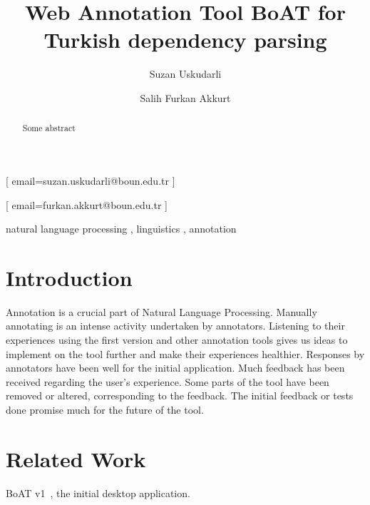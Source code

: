 \documentclass[
]{ceurart}
\begin{document}


\title{Web Annotation Tool BoAT for Turkish dependency parsing}

\author[1]{Suzan Uskudarli}[%
email=suzan.uskudarli@boun.edu.tr
]

\author[1]{Salih Furkan Akkurt}[%
email=furkan.akkurt@boun.edu.tr
]

\address[1]{ Department of Computer Engineering, Bogazici University, Bebek, 34342, İstanbul, Turkey }

\begin{abstract}
Some abstract
\end{abstract}

\begin{keywords}
natural language processing \sep
linguistics \sep
annotation
\end{keywords}

\maketitle

\section{Introduction}

Annotation is a crucial part of Natural Language Processing. Manually annotating is an intense activity undertaken by annotators. Listening to their experiences using the first version and other annotation tools gives us ideas to implement on the tool further and make their experiences healthier.
Responses by annotators have been well for the initial application. Much feedback has been received regarding the user's experience. Some parts of the tool have been removed or altered, corresponding to the feedback. The initial feedback or tests done promise much for the future of the tool.

\section{Related Work}

BoAT v1~\cite{turk-etal-2019-turkish}, the initial desktop application.
\end{document}
